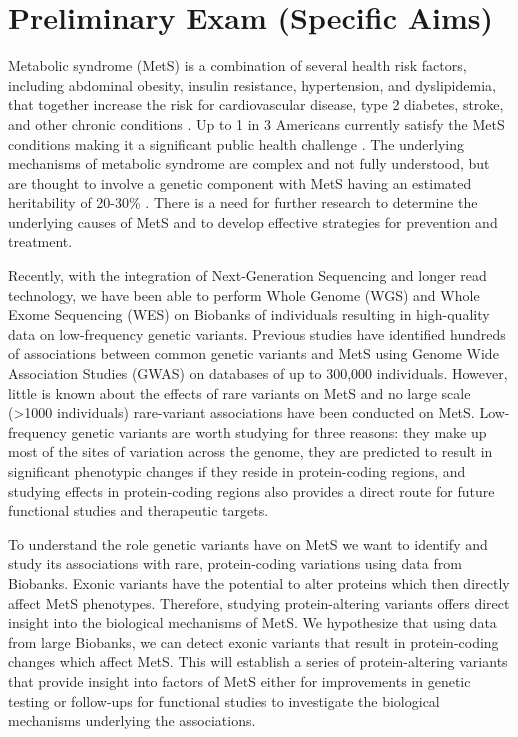 \documentclass[11pt]{article}
\begin{document}
\section*{Preliminary Exam (Specific Aims)}

Metabolic syndrome (MetS) is a combination of several health risk factors, including abdominal obesity, insulin resistance, hypertension, and dyslipidemia, that together increase the risk for cardiovascular disease, type 2 diabetes, stroke, and other chronic conditions \cite{pmid29480368}. Up to 1 in 3 Americans currently satisfy the MetS conditions making it a significant public health challenge \cite{TODO}. The underlying mechanisms of metabolic syndrome are complex and not fully understood, but are thought to involve a genetic component with MetS having an estimated heritability of 20-30\% \cite{TODO}. There is a need for further research to determine the underlying causes of MetS and to develop effective strategies for prevention and treatment.

Recently, with the integration of Next-Generation Sequencing and longer read technology, we have been able to perform Whole Genome (WGS) and Whole Exome Sequencing (WES) on Biobanks of individuals resulting in high-quality data on low-frequency genetic variants. Previous studies have identified hundreds of associations between common genetic variants and MetS using Genome Wide Association Studies (GWAS) on databases of up to 300,000 individuals. However, little is known about the effects of rare variants on MetS and no large scale (>1000 individuals) rare-variant associations have been conducted on MetS. Low-frequency genetic variants are worth studying for three reasons: they make up most of the sites of variation across the genome, they are predicted to result in significant phenotypic changes if they reside in protein-coding regions, and studying effects in protein-coding regions also provides a direct route for future functional studies and therapeutic targets. 

To understand the role genetic variants have on MetS we want to identify and study its associations with rare, protein-coding variations using data from Biobanks. Exonic variants have the potential to alter proteins which then directly affect MetS phenotypes. Therefore, studying protein-altering variants offers direct insight into the biological mechanisms of MetS. We hypothesize that using data from large Biobanks, we can detect exonic variants that result in protein-coding changes which affect MetS. This will establish a series of protein-altering variants that provide insight into factors of MetS either for improvements in genetic testing or follow-ups for functional studies to investigate the biological mechanisms underlying the associations.
\end{document}
